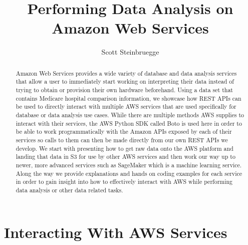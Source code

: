 
\title{Performing Data Analysis on Amazon Web Services}

\author{Scott Steinbruegge}


\renewcommand{\shortauthors}{S. Steinbruegge}


\begin{abstract}
Amazon Web Services provides a wide variety of database and data analysis 
services that allow a user to immediately start working on interpreting their 
data instead of trying to obtain or provision their own hardware beforehand. 
Using a data set that contains Medicare hospital comparison information, we 
showcase how REST APIs can be used to directly interact with multiple AWS 
services that are used specifically for database or data analysis use cases. 
While there are multiple methods AWS supplies to interact with their services, 
the AWS Python SDK called Boto is used here in order to be able to work 
programmatically with the Amazon APIs exposed by each of their services so 
calls to them can then be made directly from our own REST APIs we develop. We 
start with presenting how to get raw data onto the AWS platform and landing 
that data in S3 for use by other AWS services and then work our way up to 
newer, more advanced services such as SageMaker which is a machine learning 
service. Along the way we provide explanations and hands on coding examples 
for each service in order to gain insight into how to effectively interact 
with AWS while performing data analysis or other data related tasks. 
\end{abstract}



\maketitle

\section{Interacting With AWS Services}

